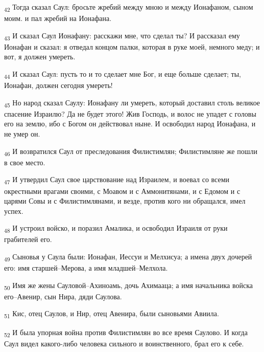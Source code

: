 \begin{tcolorbox}
\textsubscript{42} Тогда сказал Саул: бросьте жребий между мною и между Ионафаном, сыном моим. и пал жребий на Ионафана.
\end{tcolorbox}
\begin{tcolorbox}
\textsubscript{43} И сказал Саул Ионафану: расскажи мне, что сделал ты? И рассказал ему Ионафан и сказал: я отведал концом палки, которая в руке моей, немного меду; и вот, я должен умереть.
\end{tcolorbox}
\begin{tcolorbox}
\textsubscript{44} И сказал Саул: пусть то и то сделает мне Бог, и еще больше сделает; ты, Ионафан, должен сегодня умереть!
\end{tcolorbox}
\begin{tcolorbox}
\textsubscript{45} Но народ сказал Саулу: Ионафану ли умереть, который доставил столь великое спасение Израилю? Да не будет этого! Жив Господь, и волос не упадет с головы его на землю, ибо с Богом он действовал ныне. И освободил народ Ионафана, и не умер он.
\end{tcolorbox}
\begin{tcolorbox}
\textsubscript{46} И возвратился Саул от преследования Филистимлян; Филистимляне же пошли в свое место.
\end{tcolorbox}
\begin{tcolorbox}
\textsubscript{47} И утвердил Саул свое царствование над Израилем, и воевал со всеми окрестными врагами своими, с Моавом и с Аммонитянами, и с Едомом и с царями Совы и с Филистимлянами, и везде, против кого ни обращался, имел успех.
\end{tcolorbox}
\begin{tcolorbox}
\textsubscript{48} И устроил войско, и поразил Амалика, и освободил Израиля от руки грабителей его.
\end{tcolorbox}
\begin{tcolorbox}
\textsubscript{49} Сыновья у Саула были: Ионафан, Иессуи и Мелхисуа; а имена двух дочерей его: имя старшей--Мерова, а имя младшей--Мелхола.
\end{tcolorbox}
\begin{tcolorbox}
\textsubscript{50} Имя же жены Сауловой--Ахиноамь, дочь Ахимааца; а имя начальника войска его--Авенир, сын Нира, дяди Саулова.
\end{tcolorbox}
\begin{tcolorbox}
\textsubscript{51} Кис, отец Саулов, и Нир, отец Авенира, были сыновьями Авиила.
\end{tcolorbox}
\begin{tcolorbox}
\textsubscript{52} И была упорная война против Филистимлян во все время Саулово. И когда Саул видел какого-либо человека сильного и воинственного, брал его к себе.
\end{tcolorbox}
